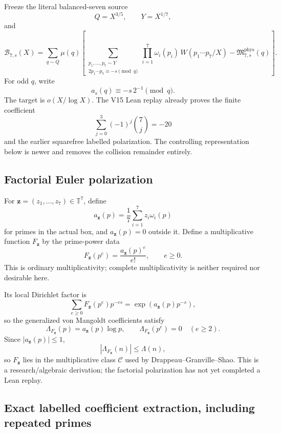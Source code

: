\documentclass[11pt]{article}
\theoremstyle{definition}
\newcommand{\1}{\mathbf 1}
\newcommand{\B}{\mathcal B}
\begin{document}
Freeze the literal balanced-seven source
\[
Q=X^{3/5},\qquad Y=X^{1/7},
\]
and
\[
\B_{7,s}(X)=
\sum_{q\sim Q}\mu(q)
\left[
\sum_{\substack{p_1,\ldots,p_7\sim Y\\2p_1\cdots p_7\equiv-s\pmod q}}
\prod_{i=1}^7\omega_i(p_i)\,W(p_1\cdots p_7/X)
-\mathfrak M^{\mathrm{phys}}_{7,s}(q)
\right].
\]
For odd $q$, write
\[
 a_s(q)\equiv -s\,2^{-1}\pmod q.
\]
The target is $o(X/\log X)$.  The V15 Lean replay already proves the finite coefficient
\[
\sum_{j=0}^3(-1)^j\binom7j=-20
\]
and the earlier squarefree labelled polarization.  The controlling representation below is
newer and removes the collision remainder entirely.

\subsection{Factorial Euler polarization}

For $\mathbf z=(z_1,\ldots,z_7)\in\mathbb T^7$, define
\[
a_{\mathbf z}(p)=\frac17\sum_{i=1}^7z_i\omega_i(p)
\]
for primes in the actual box, and $a_{\mathbf z}(p)=0$ outside it.  Define a multiplicative
function $F_{\mathbf z}$ by the prime-power data
\[
\boxed{F_{\mathbf z}(p^e)=\frac{a_{\mathbf z}(p)^e}{e!},\qquad e\ge0.}
\]
This is ordinary multiplicativity; complete multiplicativity is neither required nor
desirable here.

Its local Dirichlet factor is
\[
\sum_{e\ge0}F_{\mathbf z}(p^e)p^{-es}
=\exp\!\left(a_{\mathbf z}(p)p^{-s}\right),
\]
so the generalized von Mangoldt coefficients satisfy
\[
\Lambda_{F_{\mathbf z}}(p)=a_{\mathbf z}(p)\log p,\qquad
\Lambda_{F_{\mathbf z}}(p^e)=0\quad(e\ge2).
\]
Since $|a_{\mathbf z}(p)|\le1$,
\[
|\Lambda_{F_{\mathbf z}}(n)|\le\Lambda(n),
\]
so $F_{\mathbf z}$ lies in the multiplicative class $\mathcal C$ used by
Drappeau--Granville--Shao.  This is a research/algebraic derivation; the factorial
polarization has not yet completed a Lean replay.

\subsection{Exact labelled coefficient extraction, including repeated primes}
\end{document}
